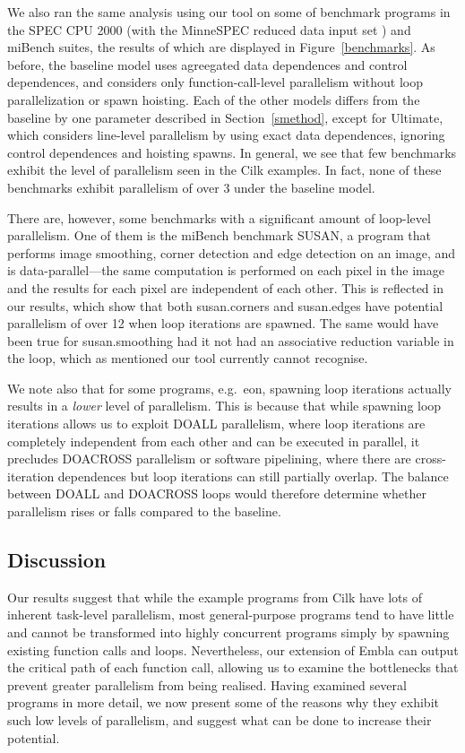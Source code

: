 We also ran the same analysis using our tool on some of benchmark programs in the SPEC CPU 2000 (with the MinneSPEC reduced data input set \cite{KleinOsowski02minnespec}) and miBench suites, the results of which are displayed in Figure~\ref{benchmarks}.
As before, the baseline model uses agreegated data dependences and control dependences, and considers only function-call-level parallelism without loop parallelization or spawn hoisting.
Each of the other models differs from the baseline by one parameter described in Section~\ref{smethod}, except for Ultimate, which considers line-level parallelism by using exact data dependences, ignoring control dependences and hoisting spawns.
In general, we see that few benchmarks exhibit the level of parallelism seen in the Cilk examples.
In fact, none of these benchmarks exhibit parallelism of over 3 under the baseline model.

There are, however, some benchmarks with a significant amount of loop-level parallelism.
One of them is the miBench benchmark SUSAN, a program that performs image smoothing, corner detection and edge detection on an image, and is data-parallel---the same computation is performed on each pixel in the image and the results for each pixel are independent of each other.
This is reflected in our results, which show that both susan.corners and susan.edges have potential parallelism of over 12 when loop iterations are spawned.
The same would have been true for susan.smoothing had it not had an associative reduction variable in the loop, which as mentioned our tool currently cannot recognise.

We note also that for some programs, e.g.\ eon, spawning loop iterations actually results in a \emph{lower} level of parallelism.
This is because that while spawning loop iterations allows us to exploit DOALL parallelism, where loop iterations are completely independent from each other and can be executed in parallel, it precludes DOACROSS parallelism or software pipelining, where there are cross-iteration dependences but loop iterations can still partially overlap.
The balance between DOALL and DOACROSS loops would therefore determine whether parallelism rises or falls compared to the baseline.

\subsection{Discussion}

Our results suggest that while the example programs from Cilk have lots of inherent task-level parallelism, most general-purpose programs tend to have little and cannot be transformed into highly concurrent programs simply by spawning existing function calls and loops.
Nevertheless, our extension of Embla can output the critical path of each function call, allowing us to examine the bottlenecks that prevent greater parallelism from being realised.
Having examined several programs in more detail, we now present some of the reasons why they exhibit such low levels of parallelism, and suggest what can be done to increase their potential.

